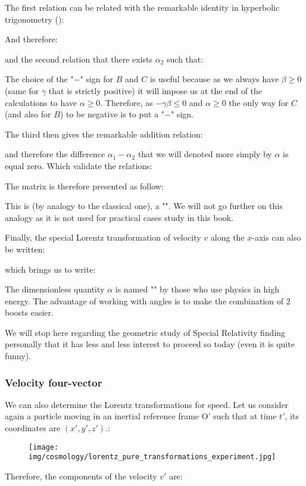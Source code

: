 	The first relation can be related with the remarkable identity in hyperbolic trigonometry ():
	
	And therefore:
	
	and the second relation that there exists $\alpha_2$ such that:
	
	\begin{tcolorbox}[title=Remark,colframe=black,arc=10pt]
	The choice of the "$-$" sign for $B$ and $C$ is useful because as we always have $\beta \geq 0$ (same for $\gamma$ that is strictly positive) it will impose us at the end of the calculations to have $\alpha\geq 0$. Therefore, as $-\gamma\beta\leq 0$ and $\alpha\geq 0$ the only way for $C$ (and also for $B$) to be negative is to put a "$-$" sign.
	\end{tcolorbox}	
	The third then gives the remarkable addition relation:
	
	and therefore the difference $\alpha_1-\alpha_2$ that we will denoted more simply by $\alpha$ is equal zero. Which validate the relations:
	
	The matrix is therefore presented as follow:
	
	This is (by analogy to the classical one), a "\label{hyperbolic rotation matrix}". We will not go further on this analogy as it is not used for practical cases study in this book.
	
	Finally, the special Lorentz transformation of velocity $v$ along the $x$-axis can also be written:
	
	which brings us to write:
	
	The dimensionless quantity $\alpha$ is named "" by those who use physics in high energy. The advantage of working with angles is to make the combination of $2$ boosts easier.

	We will stop here regarding the geometric study of Special Relativity finding personally that it has less and less interest to proceed so today (even it is quite funny).
	
	\subsubsection{Velocity four-vector}\label{four vector velocity}
	We can also determine the Lorentz transformations for speed. Let us consider again a particle moving in an inertial reference frame O' such that at time $t'$, its coordinates are $(x ', y', z ').$:
	\begin{figure}[H]
		\centering
		\texttt{[image: img/cosmology/lorentz\_pure\_transformations\_experiment.jpg]}	
	\end{figure}
	Therefore, the components of the velocity $v'$ are:
	
